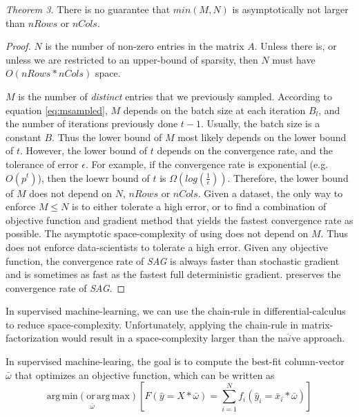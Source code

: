 \emph{Theorem 3.}  
There is no guarantee that $min(M,N)$ is asymptotically not larger than $nRows$ or $nCols$.
\begin{proof}
$N$ is the number of non-zero entries in the matrix $A$.
Unless there is, or unless we are restricted to an upper-bound of sparsity, then $N$ must have $O(nRows*nCols)$ space.

$M$ is the number of \emph{distinct} entries that we previously sampled.
According to equation \ref{eq:msampled}, $M$ depends on the batch size at each iteration $B_l$, and the number of iterations previously done $t-1$.
Usually, the batch size is a constant $B$.  Thus the lower bound of $M$ most likely depends on the lower bound of $t$.
However, the lower bound of $t$ depends on the convergence rate, and the tolerance of error $\epsilon$.
For example, if the convergence rate is exponential (e.g. $O(p^t)$), then the loewr bound of $t$ is $\Omega(log(\frac{1}{\epsilon}))$.
Therefore, the lower bound of $M$ does not depend on $N$, $nRows$ or $nCols$.
Given a dataset, the only way to enforce $M \leq N$ is to either tolerate a high error, or to find a combination of objective function and gradient method that yields the fastest convergence rate as possible.
The asymptotic space-complexity of using \tool does not depend on $M$.
Thus \tool does not enforce data-scientists to tolerate a high error.
Given any objective function, the convergence rate of \emph{SAG} \cite{schmidt2013minimizing, roux2012stochastic} is always faster than stochastic gradient and is sometimes as fast as the fastest full deterministic gradient.
\tool preserves the convergence rate of \emph{SAG}.
\end{proof}


In supervised machine-learning, we can use the chain-rule in differential-calculus to reduce space-complexity.
Unfortunately, applying the chain-rule in matrix-factorization would result in a space-complexity larger than the na$\ddot{i}$ve approach.

In supervised machine-learing, the goal is to compute the best-fit column-vector $\bar{\omega}$ that optimizes an objective function, which can be written as
\begin{equation} \label{eq:sml}
\operatorname*{arg\,min (or\,arg\,max)}_{\bar{\omega}} \left[F(\hat{y} = X*\bar{\omega}) = \sum_{i=1}^{N} f_{i}(\hat{y}_{i} = \bar{x}_{i}*\bar{\omega}) \right]
\end{equation}

